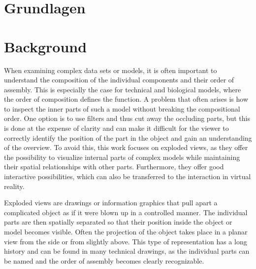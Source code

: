 {\chapter{Grundlagen}}
{\chapter{Background}}
\label{sec:background}





When examining complex data sets or models, it is often important to understand the composition of the individual components and their order of assembly. 
This is especially the case for technical and biological models, where the order of composition defines the function. 
A problem that often arises is how to inspect the inner parts of such a model without breaking the compositional order. 
One option is to use filters and thus cut away the occluding parts, but this is done at the expense of clarity and can make it difficult for the viewer to correctly identify the position of the part in the object and gain an understanding of the overview. 
To avoid this, this work focuses on exploded views, as they offer the possibility to visualize internal parts of complex models while maintaining their spatial relationships with other parts.
Furthermore, they offer good interactive possibilities, which can also be transferred to the interaction in virtual reality.

Exploded views are drawings or information graphics that pull apart a complicated object as if it were blown up in a controlled manner. 
The individual parts are then spatially separated so that their position inside the object or model becomes visible. 
Often the projection of the object takes place in a planar view from the side or from slightly above.
This type of representation has a long history and can be found in many technical drawings, as the individual parts can be named and the order of assembly becomes clearly recognizable.

